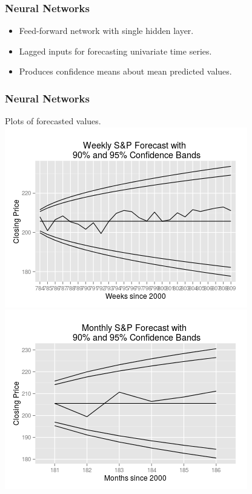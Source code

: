 \documentclass{beamer}
\begin{document}
\begin{frame}
\frametitle{Neural Networks}
\begin{itemize}
\item Feed-forward network with single hidden layer.
\item Lagged inputs for forecasting univariate time series.
\item Produces confidence means about mean predicted values.
\end{itemize}
\end{frame}


\begin{frame}
\frametitle{Neural Networks}
\begin{center}
Plots of forecasted values.
\includegraphics[scale=.4]{WeeklyNNPlot.png}
\includegraphics[scale=.4]{MonthlyNNPlot.png}
\end{center}

\end{frame}
\begin{frame}
\frametitle{}


\end{frame}
\end{document}
